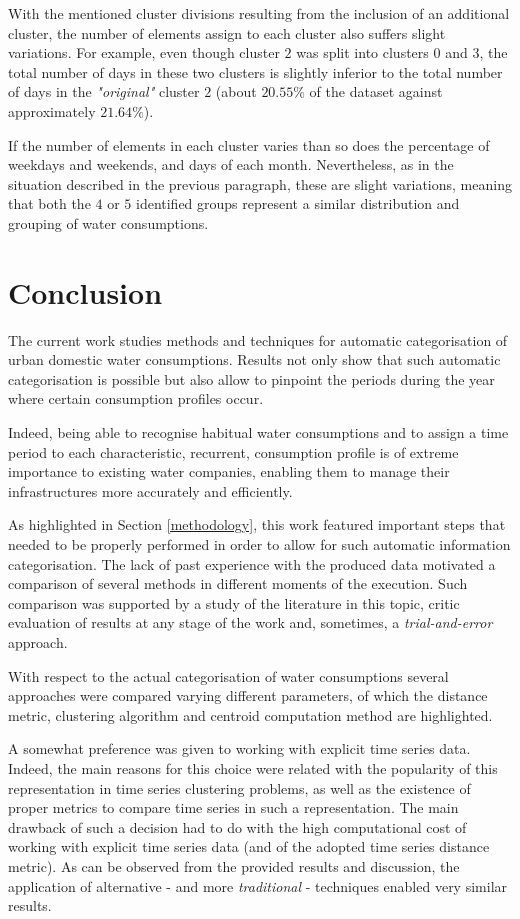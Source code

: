 \documentclass[9pt,journal,compsoc]{IEEEtran}
\begin{document}
With the mentioned cluster divisions resulting from the inclusion of an additional cluster, the number of elements assign to each cluster also suffers slight variations. For example, even though cluster $2$ was split into clusters $0$ and $3$, the total number of days in these two clusters is slightly inferior to the total number of days in the \emph{"original"} cluster $2$ (about $20.55\%$ of the dataset against approximately $21.64\%$).

If the number of elements in each cluster varies than so does the percentage of weekdays and weekends, and days of each month. Nevertheless, as in the situation described in the previous paragraph, these are slight variations, meaning that both the $4$ or $5$ identified groups represent a similar distribution and grouping of water consumptions.

\section{Conclusion}
\label{conclusions}

The current work studies methods and techniques for automatic categorisation of urban domestic water consumptions. Results not only show that such automatic categorisation is possible but also allow to pinpoint the periods during the year where certain consumption profiles occur.

Indeed, being able to recognise habitual water consumptions and to assign a time period to each characteristic, recurrent, consumption profile is of extreme importance to existing water companies, enabling them to manage their infrastructures more accurately and efficiently. 

As highlighted in Section \ref{methodology}, this work featured important steps that needed to be properly performed in order to allow for such automatic information categorisation. The lack of past experience with the produced data motivated a comparison of several methods in different moments of the execution. Such comparison was supported by a study of the literature in this topic, critic evaluation of results at any stage of the work and, sometimes, a \emph{trial-and-error} approach.

With respect to the actual categorisation of water consumptions several approaches were compared varying different parameters, of which the distance metric, clustering algorithm and centroid computation method are highlighted.

A somewhat preference was given to working with explicit time series data. Indeed, the main reasons for this choice were related with the popularity of this representation in time series clustering problems, as well as the existence of proper metrics to compare time series in such a representation. The main drawback of such a decision had to do with the high computational cost of working with explicit time series data (and of the adopted time series distance metric). As can be observed from the provided results and discussion, the application of alternative - and more \emph{traditional} - techniques enabled very similar results.
\end{document}
